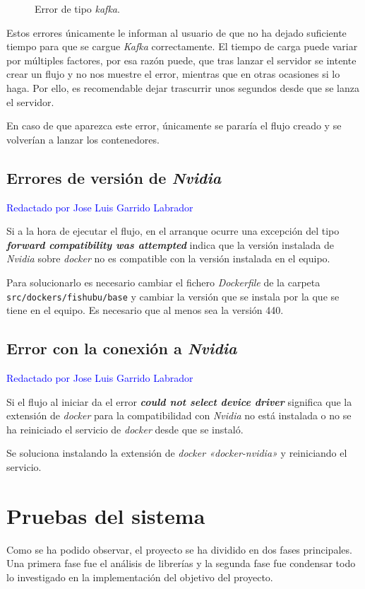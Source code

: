 \begin{figure}[H]
 \centering
{}
 \caption{Error de tipo \textit{kafka}.}
 \label{f:kafkaerror}
\end{figure}

Estos errores únicamente le informan al usuario de que no ha dejado suficiente tiempo para que se cargue \textit{Kafka} correctamente. El tiempo de carga puede variar por múltiples factores, por esa razón puede, que tras lanzar el servidor se intente crear un flujo y no nos muestre el error, mientras que en otras ocasiones si lo haga. Por ello, es recomendable dejar trascurrir unos segundos desde que se lanza el servidor. 

En caso de que aparezca este error, únicamente se pararía el flujo creado y se volverían a lanzar los contenedores. 


\subsection{Errores de versión de \textit{Nvidia}}
\textcolor{blue}{Redactado por Jose Luis Garrido Labrador}

Si a la hora de ejecutar el flujo, en el arranque ocurre una excepción del tipo \textit{\textbf{forward compatibility was attempted}} indica que la versión instalada de \textit{Nvidia} sobre \textit{docker} no es compatible con la versión instalada
en el equipo.

Para solucionarlo es necesario cambiar el fichero \emph{Dockerfile} de la carpeta \texttt{src/dockers/fishubu/base} y cambiar la versión que se instala por la que se tiene en el equipo. Es necesario que al menos sea la versión 440.

\subsection{Error con la conexión a \textit{Nvidia}}
\textcolor{blue}{Redactado por Jose Luis Garrido Labrador}

Si el flujo al iniciar da el error \textit{\textbf{could not select device driver}} significa que la extensión de \textit{docker} para la compatibilidad con \textit{Nvidia} no está instalada o no se ha reiniciado el servicio de \textit{docker} desde que se instaló.

Se soluciona instalando la extensión de \textit{docker «docker-nvidia»} y reiniciando el servicio.


\section{Pruebas del sistema}
Como se ha podido observar, el proyecto se ha dividido en dos fases principales. Una primera fase fue el análisis de librerías y la segunda fase fue condensar todo lo investigado en la implementación del objetivo del proyecto.

